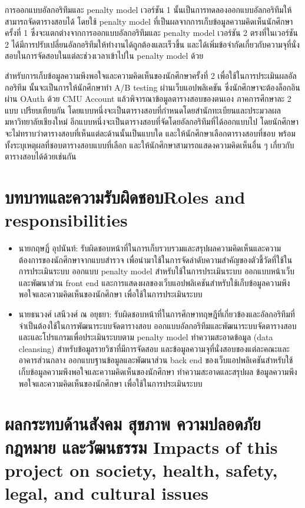 การออกแบบอัลกอริทึมและ penalty model เวอร์ชัน 1 นั้นเป็นการทดลองออกแบบอัลกอริทึมให้สามารถจัดตารางสอบได้
โดยใช้ penalty model ที่เป็นผลจากการเก็บข้อมูลความคิดเห็นนักศึกษาครั้งที่ 1 
ซึ่งจะแตกต่างจากการออกแบบอัลกอริทึมและ penalty model เวอร์ชัน 2
ตรงที่ในเวอร์ชัน 2 ได้มีการปรับเปลี่ยนอัลกอริทึมให้ทำงานได้ถูกต้องและเร็วขึ้น และได้เพิ่มข้อจำกัดเกี่ยวกับความจุที่นั่งสอบในการจัดสอบในแต่ละช่วงเวลาเข้าไปใน penalty model ด้วย


สำหรับการเก็บข้อมูลความพึงพอใจและความคิดเห็นของนักศึกษาครั้งที่ 2 เพื่อใช้ในการประเมินผลอัลกอริทึม นั้นจะเป็นการให้นักศึกษาทำ A/B testing 
ผ่านเว็บแอปพลิเคชัน ซึ่งนักศึกษาจะต้องล็อกอินผ่าน OAuth ด้วย CMU Account แล้วพิจารณาข้อมูลตารางสอบของตนเอง ภาคการศึกษาละ 2 แบบ เปรียบเทียบกัน
โดยแบบหนึ่งจะเป็นตารางสอบที่กำหนดโดยสำนักทะเบียนและประมวลผล มหาวิทยาลัยเชียงใหม่ 
อีกแบบหนึ่งจะเป็นตารางสอบที่จัดโดยอัลกอริทึมที่ได้ออกแบบไป โดยนักศึกษาจะไม่ทราบว่าตารางสอบที่เห็นแต่ละด้านนั้นเป็นแบบใด และให้นักศึกษาเลือกตารางสอบที่ชอบ พร้อมทั้งระบุเหตุผลที่ชอบตารางสอบแบบที่เลือก
และให้นักศึกษาสามารถแสดงความคิดเห็นอื่น ๆ เกี่ยวกับตารางสอบได้ด้วยเช่นกัน

\section{\ifcpe บทบาทและความรับผิดชอบ\else Roles and responsibilities\fi}
\begin{itemize}
    \item นายกฤษฏิ์ อุปนันท์: รับผิดชอบหน้าที่ในการเก็บรวบรวมและสรุปผลความคิดเห็นและความต้องการของนักศึกษาจากแบบสำรวจ เพื่อนำมาใช้ในการจัดลำดับความสำคัญของตัวชี้วัดที่ใช้ในการประเมินระบบ ออกแบบ penalty model สำหรับใช้ในการประเมินระบบ 
    ออกแบบหน้าเว็บและพัฒนาส่วน front end และการแสดงผลของเว็บแอปพลิเคชันสำหรับใช้เก็บข้อมูลความพึงพอใจและความคิดเห็นของนักศึกษา เพื่อใช้ในการประเมินระบบ
    \item นายธนวงศ์ เสนีวงศ์ ณ อยุธยา: รับผิดชอบหน้าที่ในการศึกษาทฤษฎีที่เกี่ยวข้องและอัลกอริทึมที่จำเป็นต้องใช้ในการพัฒนาระบบจัดตารางสอบ 
    ออกแบบอัลกอริทึมและพัฒนาระบบจัดตารางสอบและและโปรแกรมเพื่อประเมินระบบตาม penalty model 
    ทำความสะอาดข้อมูล (data cleansing) สำหรับข้อมูลรายวิชาที่มีการจัดสอบ และข้อมูลความจุที่นั่งสอบของแต่ละคณะและอาคารส่วนกลาง
    ออกแบบฐานข้อมูลและพัฒนาส่วน back end ของเว็บแอปพลิเคชันสำหรับใช้เก็บข้อมูลความพึงพอใจและความคิดเห็นของนักศึกษา
    ทำความสะอาดและสรุปผล ข้อมูลความพึงพอใจและความคิดเห็นของนักศึกษา เพื่อใช้ในการประเมินระบบ
\end{itemize}

\section{\ifcpe%
ผลกระทบด้านสังคม สุขภาพ ความปลอดภัย กฎหมาย และวัฒนธรรม
\else%
Impacts of this project on society, health, safety, legal, and cultural issues
\fi}

